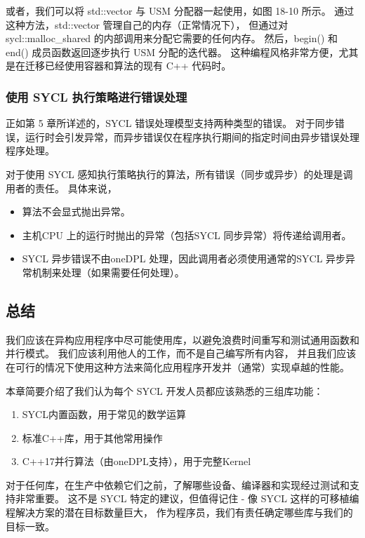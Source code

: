 或者，我们可以将 std::vector 与 USM 分配器一起使用，如图 18-10 所示。 
通过这种方法，std::vector 管理自己的内存（正常情况下），
但通过对 sycl::malloc\_shared 的内部调用来分配它需要的任何内存。 
然后，begin() 和 end() 成员函数返回逐步执行 USM 分配的迭代器。 
这种编程风格非常方便，尤其是在迁移已经使用容器和算法的现有 C++ 代码时。

\subsubsection{使用 SYCL 执行策略进行错误处理}
正如第 5 章所详述的，SYCL 错误处理模型支持两种类型的错误。 
对于同步错误，运行时会引发异常，而异步错误仅在程序执行期间的指定时间由异步错误处理程序处理。

对于使用 SYCL 感知执行策略执行的算法，所有错误（同步或异步）的处理是调用者的责任。 具体来说，

\begin{itemize}
	\item 算法不会显式抛出异常。

	\item 主机CPU 上的运行时抛出的异常（包括SYCL 同步异常）将传递给调用者。

	\item SYCL 异步错误不由oneDPL 处理，因此调用者必须使用通常的SYCL 异步异常机制来处理（如果需要任何处理）。
\end{itemize}

\subsection{总结}
我们应该在异构应用程序中尽可能使用库，以避免浪费时间重写和测试通用函数和并行模式。 
我们应该利用他人的工作，而不是自己编写所有内容，
并且我们应该在可行的情况下使用这种方法来简化应用程序开发并（通常）实现卓越的性能。

本章简要介绍了我们认为每个 SYCL 开发人员都应该熟悉的三组库功能：

\begin{enumerate}
	\item SYCL内置函数，用于常见的数学运算

	\item 标准C++库，用于其他常用操作

	\item C++17并行算法（由oneDPL支持），用于完整Kernel
\end{enumerate}

对于任何库，在生产中依赖它们之前，了解哪些设备、编译器和实现经过测试和支持非常重要。 
这不是 SYCL 特定的建议，但值得记住 - 像 SYCL 这样的可移植编程解决方案的潜在目标数量巨大，
作为程序员，我们有责任确定哪些库与我们的目标一致。